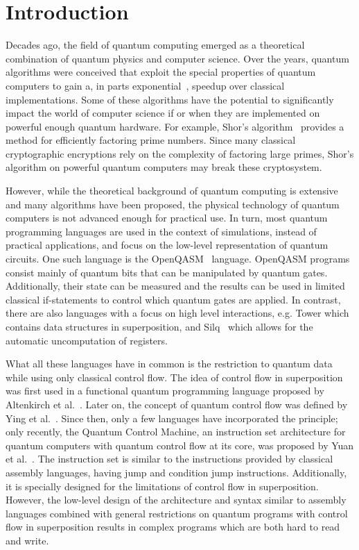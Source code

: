 \chapter{Introduction}
\label{ch:introduction}
Decades ago, the field of quantum computing emerged as a theoretical combination of quantum physics and computer science. Over the years, quantum algorithms were conceived that exploit the special properties of quantum computers to gain a, in parts exponential~\cite{BeVa93}, speedup over classical implementations. Some of these algorithms have the potential to significantly impact the world of computer science if or when they are implemented on powerful enough quantum hardware. For example, Shor's algorithm~\cite{Shor97} provides a method for efficiently factoring prime numbers. Since many classical cryptographic encryptions rely on the complexity of factoring large primes, Shor's algorithm on powerful quantum computers may break these cryptosystem.~\cite{DiCh20}

However, while the theoretical background of quantum computing is extensive and many algorithms have been proposed, the physical technology of quantum computers is not advanced enough for practical use. In turn, most quantum programming languages are used in the context of simulations, instead of practical applications, and focus on the low-level representation of quantum circuits. One such language is the OpenQASM~\cite{CBSG17} language. OpenQASM programs consist mainly of quantum bits that can be manipulated by quantum gates. Additionally, their state can be measured and the results can be used in limited classical if-statements to control which quantum gates are applied. In contrast, there are also languages with a focus on high level interactions, e.g. Tower\cite{ChMi22} which contains data structures in superposition, and Silq~\cite{BBGV20} which allows for the automatic uncomputation of registers.

What all these languages have in common is the restriction to quantum data while using only classical control flow. The idea of control flow in superposition was first used in a functional quantum programming language proposed by Altenkirch et al.~\cite{AlGr05}. Later on, the concept of quantum control flow was defined by Ying et al.~\cite{YYF12}. Since then, only a few languages have incorporated the principle; only recently, the Quantum Control Machine, an instruction set architecture for quantum computers with quantum control flow at its core, was proposed by Yuan et al.~\cite{YVC24}. 
The instruction set is similar to the instructions provided by classical assembly languages, having jump and condition jump instructions. Additionally, it is specially designed for the limitations of control flow in superposition. However, the low-level design of the architecture and syntax similar to assembly languages combined with general restrictions on quantum programs with control flow in superposition results in complex programs which are both hard to read and write.     

